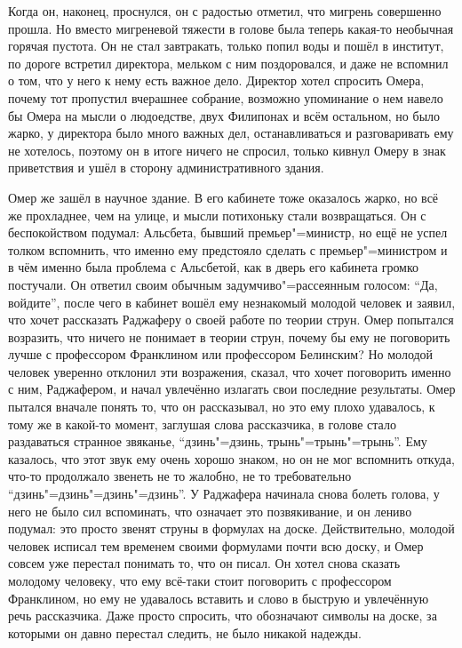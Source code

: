 Когда он, наконец, проснулся, он с радостью отметил, что мигрень совершенно
прошла.
Но вместо мигреневой тяжести в голове была теперь какая-то необычная горячая
пустота.
Он не стал завтракать, только попил воды и пошёл в институт, по дороге встретил
директора, мельком с ним поздоровался, и даже не вспомнил о том, что у него к
нему есть важное дело.
Директор хотел спросить Омера, почему тот пропустил вчерашнее собрание, возможно
упоминание о нем навело бы Омера на мысли о людоедстве, двух Филипонах и всём
остальном, но было жарко, у директора было много важных дел, останавливаться и
разговаривать ему не хотелось, поэтому он в итоге ничего не спросил, только
кивнул Омеру в знак приветствия и ушёл в сторону административного здания.

Омер же зашёл в научное здание.
В его кабинете тоже оказалось жарко, но всё же прохладнее, чем на улице, и мысли
потихоньку стали возвращаться.
Он с беспокойством подумал: Альсбета, бывший премьер"=министр, но ещё не успел
толком вспомнить, что именно ему предстояло сделать с премьер"=министром и в чём
именно была проблема с Альсбетой, как в дверь его кабинета громко постучали.
Он ответил своим обычным задумчиво"=рассеянным голосом: \enquote{Да, войдите},
после чего в кабинет вошёл ему незнакомый молодой человек и заявил, что хочет
рассказать Раджаферу о своей работе по теории струн.
Омер попытался возразить, что ничего не понимает в теории струн, почему бы ему
не поговорить лучше с профессором Франклином или профессором Белинским?
Но молодой человек уверенно отклонил эти возражения, сказал, что хочет
поговорить именно с ним, Раджафером, и начал увлечённо излагать свои последние
результаты.
Омер пытался вначале понять то, что он рассказывал, но это ему плохо удавалось,
к тому же в какой-то момент, заглушая слова рассказчика, в голове стало
раздаваться странное звяканье, \enquote{дзинь"=дзинь, трынь"=трынь"=трынь}.
Ему казалось, что этот звук ему очень хорошо знаком, но он не мог вспомнить
откуда, что-то продолжало звенеть не то жалобно, не то требовательно
\enquote{дзинь"=дзинь"=дзинь"=дзинь}.
У Раджафера начинала снова болеть голова, у него не было сил вспоминать, что
означает это позвякивание, и он лениво подумал: это просто звенят струны в
формулах на доске.
Действительно, молодой человек исписал тем временем своими формулами почти всю
доску, и Омер совсем уже перестал понимать то, что он писал.
Он хотел снова сказать молодому человеку, что ему всё-таки стоит поговорить с
профессором Франклином, но ему не удавалось вставить и слово в быструю и
увлечённую речь рассказчика.
Даже просто спросить, что обозначают символы на доске, за которыми он давно
перестал следить, не было никакой надежды.

